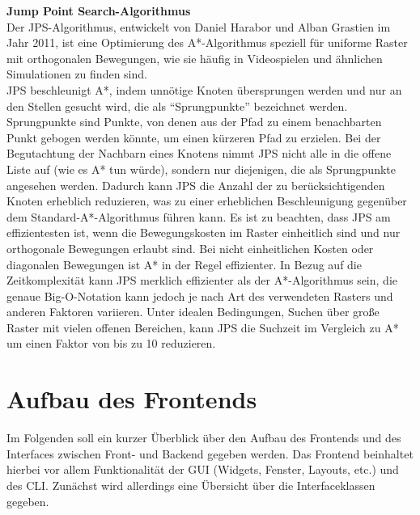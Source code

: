 \textbf{Jump Point Search-Algorithmus}\\
Der  \ac{JPS}-Algorithmus, entwickelt von Daniel Harabor und Alban Grastien im Jahr 2011, ist eine Optimierung des
A*-Algorithmus speziell für uniforme Raster mit orthogonalen Bewegungen, wie sie häufig in Videospielen und ähnlichen
Simulationen zu finden sind. \cite{harabor2011}\\
\ac{JPS} beschleunigt A*, indem unnötige Knoten übersprungen werden und nur an den Stellen gesucht wird, die als ``Sprungpunkte'' bezeichnet werden.
Sprungpunkte sind Punkte, von denen aus der Pfad zu einem benachbarten Punkt gebogen werden könnte, um einen kürzeren Pfad zu erzielen.
Bei der Begutachtung der Nachbarn eines Knotens nimmt JPS nicht alle in die offene Liste auf (wie es A* tun würde),
sondern nur diejenigen, die als Sprungpunkte angesehen werden.
Dadurch kann JPS die Anzahl der zu berücksichtigenden Knoten erheblich reduzieren, was zu einer erheblichen Beschleunigung
gegenüber dem Standard-A*-Algorithmus führen kann.
Es ist zu beachten, dass JPS am effizientesten ist, wenn die Bewegungskosten im Raster einheitlich sind und nur
orthogonale Bewegungen erlaubt sind.
Bei nicht einheitlichen Kosten oder diagonalen Bewegungen ist A* in der Regel effizienter.
In Bezug auf die Zeitkomplexität kann JPS merklich effizienter als der A*-Algorithmus sein, die genaue Big-O-Notation
kann jedoch je nach Art des verwendeten Rasters und anderen Faktoren variieren.
Unter idealen Bedingungen, Suchen über große Raster mit vielen offenen Bereichen, kann JPS die Suchzeit im Vergleich
zu A* um einen Faktor von bis zu 10 reduzieren. \cite{harabor2014}

\section{Aufbau des Frontends}
\label{sec:aufbau_frontend}
Im Folgenden soll ein kurzer Überblick über den Aufbau des Frontends und des Interfaces zwischen Front- und Backend gegeben werden.
Das Frontend beinhaltet hierbei vor allem Funktionalität der \ac{GUI} (Widgets, Fenster, Layouts, etc.) und des \ac{CLI}.
Zunächst wird allerdings eine Übersicht über die Interfaceklassen gegeben.
